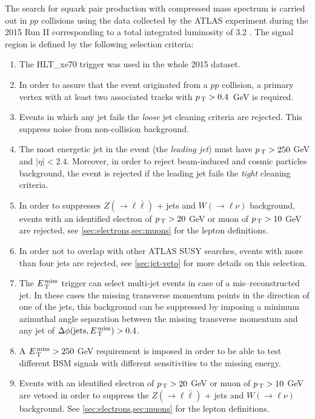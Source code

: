 The search for squark pair production with compressed mass spectrum is carried
out in $pp$ collisions using the data collected by the ATLAS experiment during
the 2015 Run II corresponding to a total integrated luminosity of 3.2 \ifb. The
signal region is defined by the following selection criteria:
\begin{enumerate}[A -]
\item The HLT\_xe70 trigger was used in the whole 2015 dataset.
\item In order to assure that the event originated from a $pp$ collision, a
  primary vertex with at least two associated tracks with $p_\mathrm{\, T} > 0.4$~GeV is
  required.
\item Events in which any jet fails the \emph{loose} jet cleaning criteria are
  rejected. This suppress noise from non-collision background.
\item The most energetic jet in the event (the \emph{leading jet}) must have
  $p_\mathrm{\, T} > 250~$GeV and $|\eta| < 2.4$. Moreover, in order to reject beam-induced
  and cosmic particles background, the event is rejected if the leading jet
  fails the \emph{tight} cleaning criteria.
\item In order to suppresses $Z (\rightarrow \ell \bar{\ell})$ + jets and
  $W (\rightarrow \ell \nu)$ background, events with an identified electron of
  $p_\mathrm{\, T} > 20~$GeV or muon of $p_\mathrm{\, T} > 10~$GeV are rejected, see
  \cref{sec:electrons,sec:muons} for the lepton definitions.
\item In order not to overlap with other ATLAS SUSY searches, events with more
  than four jets are rejected, see \cref{sec:jet-veto} for more details on this
  selection.
\item The $E_\mathrm{\, T}^\mathrm{\, miss}$ trigger can select multi-jet events in case of a
  mis--reconstructed jet. In these cases the missing transverse momentum points
  in the direction of one of the jets, this background can be suppressed by
  imposing a minimum azimuthal angle separation between the missing transverse
  momentum and any jet of $\Delta \phi (\mathrm{jets}, E_\mathrm{\, T}^\mathrm{\, miss}) > 0.4$.
\item A $E_\mathrm{\, T}^\mathrm{\, miss} > 250~$GeV requirement is imposed in order to be able to test
  different BSM signals with different sensitivities to the missing energy.
\item Events with an identified electron of $p_\mathrm{\, T} > 20~$GeV or muon of
  $p_\mathrm{\, T} > 10~$GeV are vetoed in order to suppress the
  $Z (\rightarrow \ell \bar{\ell})$ + jets and $W (\rightarrow \ell \nu)$
  background. See \cref{sec:electrons,sec:muons} for the lepton definitions.
\end{enumerate}
